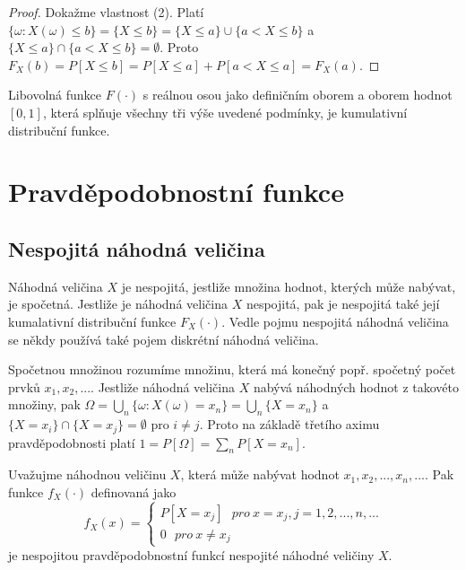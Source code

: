 \begin{proof}
Dokažme vlastnost (2). Platí $\{\omega: X(\omega) \le b\} = \{X \le b \} = \{X \le a \} \cup \{ a < X \le b\}$ a $\{X \le a \} \cap \{a < X \le b\} = \emptyset$. Proto $F_X(b) = P[X \le b] = P[X \le a] + P[a < X \le a] = F_X(a)$.
\end{proof}

\begin{definition}
Libovolná funkce $F(\cdot)$ s reálnou osou jako definičním oborem a oborem hodnot $[0, 1]$, která splňuje všechny tři výše uvedené podmínky, je kumulativní distribuční funkce.
\end{definition}

\section{Pravděpodobnostní funkce}

\subsection{Nespojitá náhodná veličina}

\begin{definition} 
Náhodná veličina $X$ je nespojitá, jestliže množina hodnot, kterých může nabývat, je spočetná. Jestliže je náhodná veličina $X$ nespojitá, pak je nespojitá také její kumalativní distribuční funkce $F_X(\cdot)$. Vedle pojmu nespojitá náhodná veličina se někdy používá také pojem diskrétní náhodná veličina.
\end{definition}

Spočetnou množinou rozumíme množinu, která má konečný popř. spočetný počet prvků $x_1, x_2, ...$. Jestliže náhodná veličina $X$ nabývá náhodných hodnot z takovéto množiny, pak $\Omega = \bigcup_n \{\omega: X(\omega) = x_n\} = \bigcup_n \{X = x_n \}$ a $\{X = x_i\} \cap \{X = x_j\} = \emptyset$ pro $i \not= j$. Proto na základě třetího aximu pravděpodobnosti platí $1 = P[\Omega] = \sum_n P[X = x_n]$.

\begin{definition}
Uvažujme náhodnou veličinu $X$, která může nabývat hodnot $x_1, x_2, ..., x_n, ...$. Pak funkce $f_X(\cdot)$ definovaná jako
\begin{equation*}
f_X(x) =
\begin{cases}
P[X = x_j]~~~\textit{pro}~x=x_j, j = 1, 2, ..., n, ...\\
0~~~\textit{pro}~x \not= x_j
\end{cases}
\end{equation*}
je nespojitou pravděpodobnostní funkcí nespojité náhodné veličiny $X$.
\end{definition}

